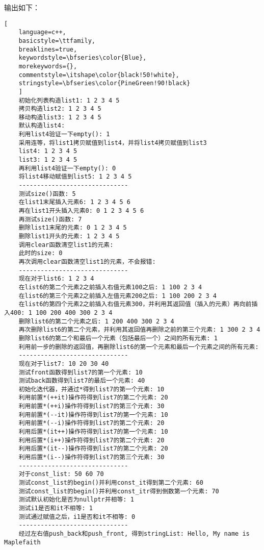 \documentclass[UTF8]{ctexart}
\begin{document}
输出如下：
\begin{lstlisting}[ 
    language=c++,
    basicstyle=\ttfamily,
    breaklines=true,
    keywordstyle=\bfseries\color{Blue}, 
    morekeywords={}, 
    commentstyle=\itshape\color{black!50!white},
    stringstyle=\bfseries\color{PineGreen!90!black} 
    ]
    初始化列表构造list1: 1 2 3 4 5 
    拷贝构造list2: 1 2 3 4 5 
    移动构造list3: 1 2 3 4 5 
    默认构造list4: 
    利用list4验证一下empty(): 1
    采用连等，将list1拷贝赋值到list4，并将list4拷贝赋值到list3
    list4: 1 2 3 4 5 
    list3: 1 2 3 4 5 
    再利用list4验证一下empty(): 0
    将list4移动赋值到list5: 1 2 3 4 5 
    ------------------------------
    测试size()函数: 5
    在list1末尾插入元素6: 1 2 3 4 5 6 
    再在list1开头插入元素0: 0 1 2 3 4 5 6 
    再测试size()函数: 7
    删除list1末尾的元素: 0 1 2 3 4 5 
    删除list1开头的元素: 1 2 3 4 5 
    调用clear函数清空list1的元素: 
    此时的size: 0
    再次调用clear函数清空list1的元素，不会报错: 
    ------------------------------
    现在对于list6: 1 2 3 4 
    在list6的第二个元素2之前插入右值元素100之后: 1 100 2 3 4 
    在list6的第三个元素2之前插入左值元素200之后: 1 100 200 2 3 4 
    在list6的第四个元素2之前插入右值元素300，并利用其返回值（插入的元素）再向前插入400: 1 100 200 400 300 2 3 4 
    删除list6的第二个元素之后: 1 200 400 300 2 3 4 
    再次删除list6的第二个元素，并利用其返回值再删除之前的第三个元素: 1 300 2 3 4 
    删除list6的第二个和最后一个元素（包括最后一个）之间的所有元素: 1 
    利用前一步的删除的返回值，再删除list6的第一个元素和最后一个元素之间的所有元素: 
    ------------------------------
    现在对于list7: 10 20 30 40 
    测试front函数得到list7的第一个元素: 10
    测试back函数得到list7的最后一个元素: 40
    初始化迭代器，并通过*得到list7的第一个元素: 10
    利用前置*(++it)操作符得到list7的第二个元素: 20
    利用前置*(++i)操作符得到list7的第三个元素: 30
    利用前置*(--it)操作符得到list7的第一个元素: 10
    利用前置*(--i)操作符得到list7的第二个元素: 20
    利用后置*(it++)操作符得到list7的第一个元素: 10
    利用后置*(i++)操作符得到list7的第二个元素: 20
    利用后置*(it--)操作符得到list7的第二个元素: 20
    利用后置*(i--)操作符得到list7的第三个元素: 30
    ------------------------------
    对于const_list: 50 60 70 
    测试const_list的begin()并利用const_it得到第二个元素: 60
    测试const_list的begin()并利用const_itr得到倒数第一个元素: 70
    测试默认初始化是否为nullptr并相等: 1
    测试i1是否和it不相等: 1
    测试通过赋值之后，i1是否和it不相等: 0
    ------------------------------
    经过左右值push_back和push_front, 得到stringList: Hello, My name is Maplefaith
\end{lstlisting}
\end{document}
